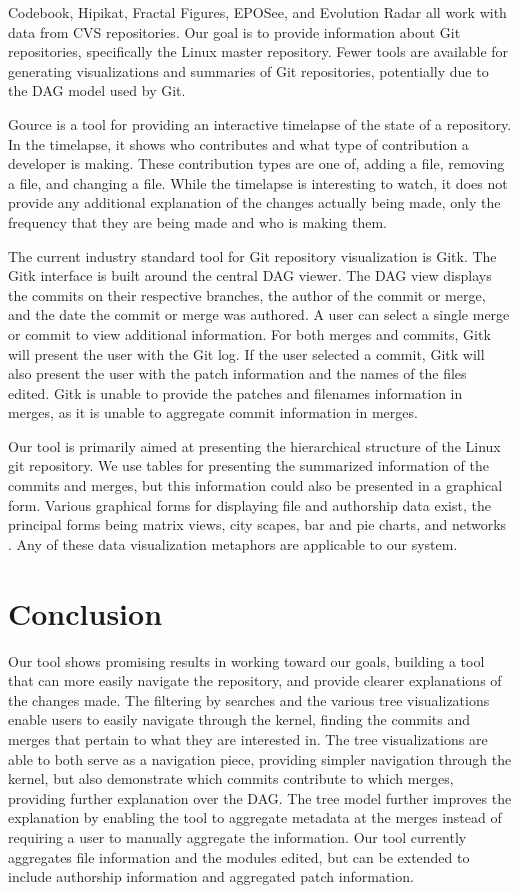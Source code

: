 \documentclass[conference, draftclsnofoot, draft]{IEEEtran}
\begin{document}
Codebook, Hipikat, Fractal Figures, EPOSee, and Evolution Radar all work with data
from CVS repositories. Our goal is to provide information about Git repositories,
specifically the Linux master repository. Fewer tools are available for generating
visualizations and summaries of Git repositories, potentially due to the DAG model
used by Git.

Gource is a tool for providing an interactive timelapse of the state of a
repository\cite{Caudwell2010}. In the timelapse, it shows who contributes and what
type of contribution a developer is making. These contribution types are one of,
adding a file, removing a file, and changing a file. While the timelapse is
interesting to watch, it does not provide any additional explanation of the changes
actually being made, only the frequency that they are being made and who is making
them.

The current industry standard tool for Git repository visualization is Gitk. The
Gitk interface is built around the central DAG viewer. The DAG view displays the
commits on their respective branches, the author of the commit or merge, and the
date the commit or merge was authored. A user can select a single merge or commit
to view additional information. For both merges and commits, Gitk will present the
user with the Git log. If the user selected a commit, Gitk will also present the
user with the patch information and the names of the files edited. Gitk is unable to
provide the patches and filenames information in merges, as it is unable to
aggregate commit information in merges.

Our tool is primarily aimed at presenting the hierarchical structure of the Linux
git repository. We use tables for presenting the summarized information of the
commits and merges, but this information could also be presented in a graphical
form. Various graphical forms for displaying file and authorship data exist, the
principal forms being matrix views, city scapes, bar and pie charts, and networks
\cite{Eick2002}. Any of these data visualization metaphors are applicable to our
system.

\section{Conclusion}

Our tool shows promising results in working toward our goals, building a tool that
can more easily navigate the repository, and provide clearer explanations of the
changes made. The filtering by searches and the various tree visualizations enable
users to easily navigate through the kernel, finding the commits and merges that
pertain to what they are interested in. The tree visualizations are able to both
serve as a navigation piece, providing simpler navigation through the kernel, but
also demonstrate which commits contribute to which merges, providing further
explanation over the DAG. The tree model further improves the explanation by enabling
the tool to aggregate metadata at the merges instead of requiring a user to manually
aggregate the information. Our tool currently aggregates file information and the
modules edited, but can be extended to include authorship information and aggregated
patch information.
\end{document}
